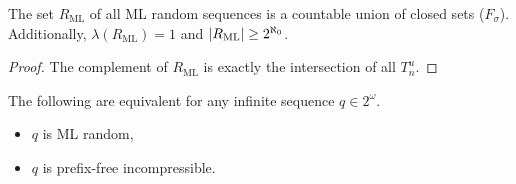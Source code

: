 
\begin{corollary}
  The set $R_{\text{ML}}$ of all ML random sequences is a countable union of
  closed sets ($F_\sigma$).
  Additionally, $\lambda(R_{\text{ML}}) = 1$ and $\left| R_{\text{ML}} \right| \ge
  2^{\aleph_0}$.
\end{corollary}

\begin{proof}
  The complement of $R_{\text{ML}}$ is exactly the intersection of all $T_n^u$.
\end{proof}

\begin{theorem}
  The following are equivalent for any infinite sequence $q \in 2^\omega$.
  \begin{itemize}
  \item $q$ is ML random,
  \item $q$ is prefix-free incompressible.
  \end{itemize}
\end{theorem}

